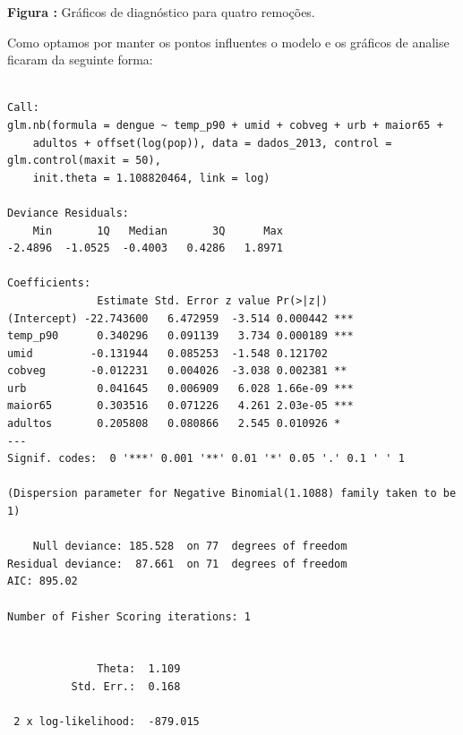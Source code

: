 \documentclass[12pt,a4paper]{article}\usepackage[]{graphicx}\usepackage[]{color}
\makeatletter
\newenvironment{kframe}{%
 \def\at@end@of@kframe{}%
 \ifinner\ifhmode%
  \def\at@end@of@kframe{\end{minipage}}%
  \begin{minipage}{\columnwidth}%
 \fi\fi%
 \def\FrameCommand##1{\hskip\@totalleftmargin \hskip-\fboxsep
 \colorbox{shadecolor}{##1}\hskip-\fboxsep
     \hskip-\linewidth \hskip-\@totalleftmargin \hskip\columnwidth}%
 \MakeFramed {\advance\hsize-\width
   \@totalleftmargin\z@ \linewidth\hsize
   \@setminipage}}%
 {\par\unskip\endMakeFramed%
 \at@end@of@kframe}
\newenvironment{knitrout}{}{} %
\makeatother
\begin{document}
\textbf{Figura :} Gráficos de diagnóstico para quatro remoções.


Como optamos por manter os pontos influentes o modelo e os gráficos de analise ficaram da seguinte forma:




\begin{knitrout}
\color{fgcolor}\begin{kframe}
\begin{verbatim}

Call:
glm.nb(formula = dengue ~ temp_p90 + umid + cobveg + urb + maior65 + 
    adultos + offset(log(pop)), data = dados_2013, control = glm.control(maxit = 50), 
    init.theta = 1.108820464, link = log)

Deviance Residuals: 
    Min       1Q   Median       3Q      Max  
-2.4896  -1.0525  -0.4003   0.4286   1.8971  

Coefficients:
              Estimate Std. Error z value Pr(>|z|)    
(Intercept) -22.743600   6.472959  -3.514 0.000442 ***
temp_p90      0.340296   0.091139   3.734 0.000189 ***
umid         -0.131944   0.085253  -1.548 0.121702    
cobveg       -0.012231   0.004026  -3.038 0.002381 ** 
urb           0.041645   0.006909   6.028 1.66e-09 ***
maior65       0.303516   0.071226   4.261 2.03e-05 ***
adultos       0.205808   0.080866   2.545 0.010926 *  
---
Signif. codes:  0 '***' 0.001 '**' 0.01 '*' 0.05 '.' 0.1 ' ' 1

(Dispersion parameter for Negative Binomial(1.1088) family taken to be 1)

    Null deviance: 185.528  on 77  degrees of freedom
Residual deviance:  87.661  on 71  degrees of freedom
AIC: 895.02

Number of Fisher Scoring iterations: 1


              Theta:  1.109 
          Std. Err.:  0.168 

 2 x log-likelihood:  -879.015 
\end{verbatim}
\end{kframe}
\end{knitrout}
\end{document}
